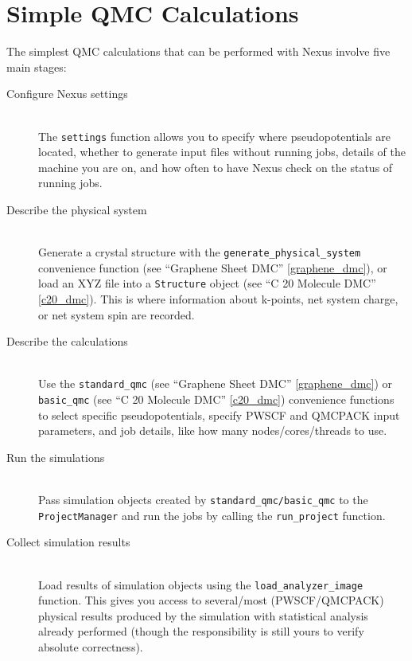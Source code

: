 \documentclass[oneside,11pt]{memoir}
\numberwithin{equation}{section}
\begin{document}
\pagebreak
\section{Simple QMC Calculations} \label{simple_qmc}
The simplest QMC calculations that can be performed with Nexus 
involve five main stages:
\begin{description}
  \item[Configure Nexus settings] \hfill \\
    The \texttt{settings} function allows you to specify where pseudopotentials 
    are located, whether to generate input files without running jobs, details 
    of the machine you are on, and how often to have Nexus check 
    on the status of running jobs.  

  \item[Describe the physical system] \hfill \\
    Generate a crystal structure with the \texttt{generate\_physical\_system} 
    convenience function (see ``Graphene Sheet DMC'' \ref{graphene_dmc}), 
    or load an XYZ file into a \texttt{Structure} object 
    (see ``C 20 Molecule DMC'' \ref{c20_dmc}).  This is where 
    information about k-points, net system charge, or net system spin are 
    recorded.

  \item[Describe the calculations] \hfill \\
    Use the \texttt{standard\_qmc} (see ``Graphene Sheet DMC'' 
    \ref{graphene_dmc}) or \texttt{basic\_qmc} (see ``C 20 Molecule DMC'' 
    \ref{c20_dmc}) convenience functions 
    to select specific pseudopotentials, specify PWSCF and QMCPACK input 
    parameters, and job details, like how many nodes/cores/threads to use.

  \item[Run the simulations] \hfill \\
    Pass simulation objects created by \texttt{standard\_qmc/basic\_qmc} to 
    the \texttt{ProjectManager} and run the jobs by calling the 
    \texttt{run\_project} function.

  \item[Collect simulation results] \hfill \\
    Load results of simulation objects using the \texttt{load\_analyzer\_image} 
    function.  This gives you access to several/most (PWSCF/QMCPACK) physical 
    results produced by the simulation with statistical analysis already 
    performed (though the responsibility is still yours to verify absolute 
    correctness).
\end{description}
\end{document}
